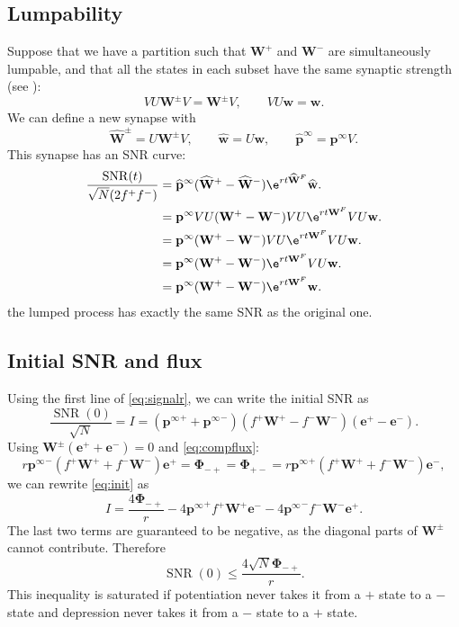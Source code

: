 \documentclass[12pt]{article}
\newcommand{\onev}{\mathbf{e}}
\newcommand{\eq}{\mathbf{p}^\infty}
\newcommand{\w}{\mathbf{w}}
\newcommand{\W}{\mathbf{W}}
\newcommand{\F}{\boldsymbol{\Phi}}
\DeclareMathOperator{\SNR}{SNR}
\begin{document}
\subsection{Lumpability}\label{sec:SNRlump}

Suppose that we have a partition such that $\W^+$ and $\W^-$ are simultaneously lumpable, and that all the states in each subset have the same synaptic strength (see ):
%
\begin{equation}\label{eq:lumpablesynapse}
  VU\W^\pm V = \W^\pm V,
  \qquad
  VU\w=\w.
\end{equation}
%
We can define a new synapse with
%
\begin{equation}\label{eq:lumpedsynapse}
  \widehat{\W}^\pm = U\W^\pm V,
  \qquad
  \widehat{\w} = U \w,
  \qquad
  \widehat{\mathbf{p}}^\infty = \eq V.
\end{equation}
%
This synapse has an SNR curve:
%
\begin{equation}\label{eq:lumpedSNR}
  \begin{aligned}
    \frac{\SNR(t)}{\sqrt{N} (2f^+f^-)} &=  \widehat{\mathbf{p}}^\infty (\widehat{\W}^+ - \widehat{\W}^-)\e^{rt\widehat{\W}^F}\widehat{\w}. \\
      &= \eq VU (\W^+ - \W^-) VU \e^{rt\W^F} VU \w. \\
      &= \eq (\W^+ - \W^-) VU \e^{rt\W^F} VU \w. \\
      &= \eq (\W^+ - \W^-)\e^{rt\W^F} VU \w. \\
      &= \eq (\W^+ - \W^-)\e^{rt\W^F}\w. \\
  \end{aligned}
\end{equation}
%
\ie the lumped process has exactly the same SNR as the original one.


\subsection{Initial SNR and flux}\label{sec:initflux}

Using the first line of \eqref{eq:signalr}, we can write the initial SNR as
%
\begin{equation}\label{eq:init}
  \frac{\SNR(0)}{\sqrt{N}} = I = ({\eq}^++{\eq}^-)(f^+\W^+-f^-\W^-)(\onev^+-\onev^-).
\end{equation}
%
Using $\W^\pm(\onev^++\onev^-)=0$ and \eqref{eq:compflux}:
%
\begin{equation*}
  r{\eq}^-(f^+\W^++f^-\W^-)\onev^+ = \F_{-+} = \F_{+-} = r{\eq}^+(f^+\W^++f^-\W^-)\onev^-,
\end{equation*}
%
we can rewrite \eqref{eq:init} as
%
\begin{equation}\label{eq:initflux}
  I = \frac{4\F_{-+}}{r} - 4{\eq}^+f^+\W^+\onev^- - 4{\eq}^-f^-\W^-\onev^+.
\end{equation}
%
The last two terms are guaranteed to be negative, as the diagonal parts of $\W^\pm$ cannot contribute.
Therefore
%
\begin{equation}\label{eq:initfluxineq}
  \SNR(0) \leq \frac{4\sqrt{N}\F_{-+}}{r}.
\end{equation}
%
This inequality is saturated if potentiation never takes it from a $+$ state to a $-$ state and depression never takes it from a $-$ state to a $+$ state.
\end{document}

